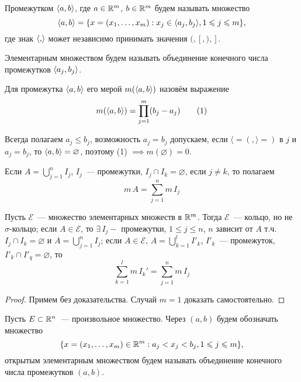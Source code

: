 \documentclass[main]{subfiles}
\begin{document}
\begin{definition}
    Промежутком $\langle{a,b}\rangle$, где $a\in\mathbb{R}^m$, $ b\in\mathbb{R}^m$ будем называть множество
    \[\langle{a,b}\rangle = \{x = (x_1,\dotsc,x_m): x_j \in \langle{a_j, b_j}\rangle, 1 \leqslant j \leqslant m\},\]
    где знак $\langle{,}\rangle$ может независимо принимать значения $(,[,),]$.
\end{definition}

\begin{definition}
    Элементарным множеством будем называть объединение конечного числа промежутков $\langle{a_j,b_j}\rangle$.
\end{definition}

\begin{definition}
    Для промежутка $\langle{a,b}\rangle$ его мерой $m(\langle{a,b}\rangle)$ назовём выражение
    \[ m(\langle{a,b}\rangle)=\prod_{j=1}^{m}(b_j-a_j)\tag{1} \]
\end{definition}

\begin{remark}
    Всегда полагаем $a_j\le b_j$, возможность $a_j=b_j$ допускаем, если $\langle=(, \rangle = )$ в $j$ и $a_j=b_j$, то $\langle{a,b}\rangle=\varnothing$, поэтому (1) $\implies m(\varnothing)=0$.
\end{remark}

\begin{remark}
    Если $A = \bigcup_{j=1}^n I_j$, $I_j$~--- промежутки, $I_j \cap I_k=\varnothing$, если $j\neq k$, то полагаем
    \[ m\,A=\sum_{j=1}^n m\,I_j\tag{2} \]
\end{remark}

\begin{theorem}
    Пусть $\mathcal{E}$~--- множество элементарных множеств в $\mathbb{R}^m$.
    Тогда $\mathcal{E}$~--- кольцо, но не $\sigma$-кольцо; если $A\in\mathcal{E}$, то $\exists\,I_j-$ промежутки, $1\le j\le n$, $n$ зависит от $A$ т.ч. $I_j\cap I_k=\varnothing$ и $A=\bigcup_{j=1}^n I_j$; если $A\in\mathcal{E}$, $ A=\bigcup_{k=1}^l I'_k$, $I'_k$~--- промежуток, $I'_k\cap I'_q=\varnothing$, то
    \[ \sum_{k=1}^l m\,I_k'=\sum_{j=1}^n m\,I_j \]
\end{theorem}

\begin{proof}
    Примем без доказательства.
    Случай $m=1$ доказать самостоятельно.
\end{proof}

\begin{definition}
    Пусть $E\subset\mathbb{R}^n$~--- произвольное множество.
    Через $(a,b)$ будем обозначать множество
    \[\{ x=(x_1,\dotsc,x_m)\in\mathbb{R}^m: a_j<x_j<b_j, 1\leqslant j\leqslant m\},\]
    открытым элементарным множеством будем называть объединение конечного числа промежутков $(a,b)$.
\end{definition}
\end{document}
